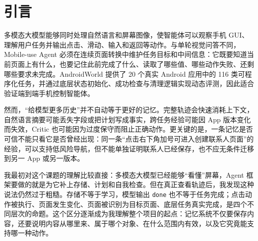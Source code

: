 \documentclass[12pt,a4paper]{ctexart}
\newcommand{\code}[1]{\texttt{#1}}
\begin{document}
\begin{abstract}
为排除自建控制器设置造成的能力下限，本文随后对齐 Qwen 官方公开的 Mobile Agent 运行方式，并在同一 Qwen3-VL-32B-Instruct revision 上完成19类 Hard tasks、3个 seeds、共57个唯一任务单元。最终成功7/57（12.28\%），另有2个部分得分单元；完整运行包含1,175次可计入的模型调用。该结果证明此前 B3/M0 的全零不能等价解释为 Qwen 在 Hard 上完全无能力，同时也暴露21次错误完成声明、39个重复状态 episode 和14个停滞 episode。基于此，我预注册了一次 matched L4 ``动作后无页面变化则不承认动作语义已经实现'' 的最小干预。干预没有获得任务成功，且在 OsmAnd 中只是减少无变化循环后更早地错误结束。因果回放表明，更早的断点是把普通地点搜索误当成向轨迹加入途经点，即目标对象和操作角色在产生真实页面变化时就已绑定错误。这个负结果把下一步问题从笼统的 ``抑制重复动作'' 收缩为 ``在动作前验证当前对象是否具有完成该子目标的资格''。

\noindent 关键词：Mobile-use Agent；多模态大模型；GUI Agent；记忆管理；AndroidWorld；证据绑定；可靠性
\end{abstract}

\clearpage
\tableofcontents
\clearpage

\section{引言}

多模态大模型能够同时处理自然语言和屏幕图像，使智能体可以观察手机 GUI、理解用户任务并输出点击、滑动、输入和返回等动作。与单轮视觉问答不同，Mobile-use Agent 必须在连续页面转换中维护任务目标和中间信息：它既要知道当前页面上有什么，也要记住此前完成了什么、读取了哪些值、哪些动作失败、还剩哪些要求未完成。AndroidWorld 提供了 20 个真实 Android 应用中的 116 类可程序化任务，并通过底层状态初始化、成功检查与清理逻辑实现动态评测\cite{androidworld}，因此适合验证端到端手机控制智能体。

然而，“给模型更多历史”并不自动等于更好的记忆。完整轨迹会快速消耗上下文，自然语言摘要可能丢失字段或把计划写成事实，跨任务经验可能因 App 版本变化而失效，Critic 也可能因为过度保守而阻止正确动作。更关键的是，一条记忆是否可信不能只看它是否曾经出现：同一条“点击右下角加号可进入创建联系人页面”的经验，可以支持低风险导航，但不能单独证明联系人已经保存，也不应无条件迁移到另一 App 或另一版本。

我最初对这个课题的理解比较直接：多模态大模型已经能够“看懂”屏幕，Agent 框架要做的就是为它补上存储、计划和自我检查。但在真正查看轨迹后，我发现这种说法仍然过于粗糙。存储不等于学习，模型输出 \code{done} 也不等于任务完成；点击动作被执行、页面发生变化、页面被识别为目标页面、底层任务真实完成，是四个不同层次的命题。这个区分逐渐成为我理解整个项目的起点：记忆系统不仅要保存内容，还要说明内容从哪里来、属于哪个对象、在什么范围内有效，以及它究竟能支持哪一种动作。
\end{document}
